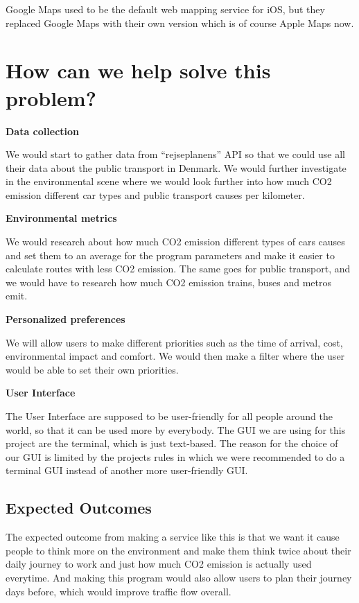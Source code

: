 \documentclass[11pt]{article}
\begin{document}
    Google Maps used to be the default web mapping service for iOS, but they replaced Google Maps with their own version
    which is of course Apple Maps now. \cite{AppleMapsWiki} \newline


    \section{How can we help solve this problem?}\label{sec:how-can-we-help-solve-this-problem?}

    \textbf{Data collection}

    We would start to gather data from ``rejseplanens'' API so that we could use all their data about the public transport
    in Denmark.
    We would further investigate in the environmental scene where we would look further into how much CO2 emission different car types
    and public transport causes per kilometer.

    \textbf{Environmental metrics}

    We would research about how much CO2 emission different types of cars causes and set them to an average for the program
    parameters and make it easier to calculate routes with less CO2 emission.
    The same goes for public transport, and we would have to research how much CO2 emission trains, buses and metros emit.

    \textbf{Personalized preferences}

    We will allow users to make different priorities such as the time of arrival, cost, environmental impact and comfort.
    We would then make a filter where the user would be able to set their own priorities.

    \textbf{User Interface}

    The User Interface are supposed to be user-friendly for all people around the world, so that it can be used more by everybody.
    The GUI we are using for this project are the terminal, which is just text-based.
    The reason for the choice of our GUI is limited by the projects rules in which we were recommended to do a terminal GUI
    instead of another more user-friendly GUI.

    \subsection{Expected Outcomes}\label{subsec:expected-outcomes}

    The expected outcome from making a service like this is that we want it cause people to think more on the environment
    and make them think twice about their daily journey to work and just how much CO2 emission is actually used everytime.
    And making this program would also allow users to plan their journey days before, which would improve traffic flow
    overall.


    
    
\end{document}
